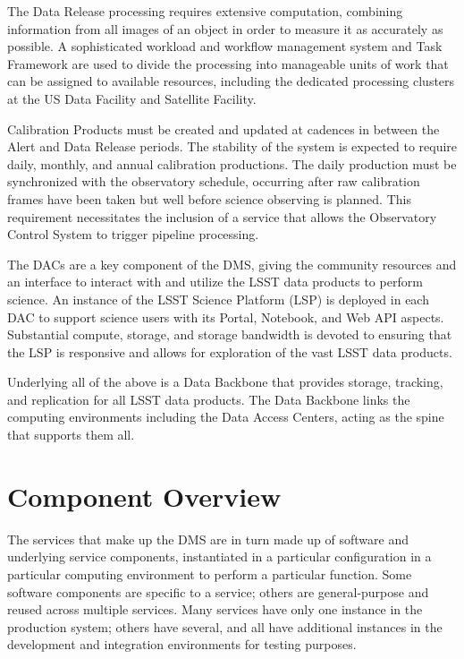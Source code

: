\documentclass[DM,toc,lsstdraft]{lsstdoc}
\begin{document}
The Data Release processing requires extensive computation, combining
information from all images of an object in order to measure it as
accurately as possible.  A sophisticated workload and workflow management
system and Task Framework are used to divide the processing into
manageable units of work that can be assigned to available resources,
including the dedicated processing clusters at the US Data Facility and Satellite Facility.

Calibration Products must be created and updated at cadences in between
the Alert and Data Release periods.  The stability of the system is expected to
require daily, monthly, and annual calibration productions.  The daily
production must be synchronized with the observatory schedule, occurring after
raw calibration frames have been taken but well before science observing is
planned.  This requirement necessitates the inclusion of a service that allows
the Observatory Control System to trigger pipeline processing.

The DACs are a key component of the DMS, giving the community resources and an
interface to interact with and utilize the LSST data products to perform
science.  An instance of the LSST Science Platform (LSP) is deployed in each
DAC to support science users with its Portal, Notebook, and Web
API aspects.  Substantial compute, storage, and storage bandwidth is devoted to
ensuring that the LSP is responsive and allows for exploration of the vast
LSST data products.

Underlying all of the above is a Data Backbone that provides storage, tracking,
and replication for all LSST data products.  The Data Backbone links the
computing environments including the Data Access Centers, acting as the spine that
supports them all.



\section{Component Overview}\label{component-overview}

The services that make up the DMS are in turn made up of software and
underlying service components, instantiated in a particular
configuration in a particular computing environment to perform a
particular function. Some software components are specific to a service;
others are general-purpose and reused across multiple services. Many
services have only one instance in the production system; others have
several, and all have additional instances in the development and
integration environments for testing purposes.
\end{document}

